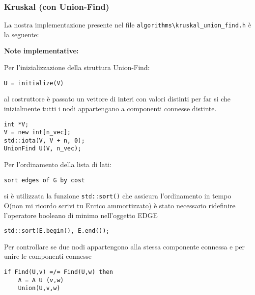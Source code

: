 \documentclass[]{article}
\begin{document}
\subsubsection{Kruskal (con Union-Find)}
\begin{flushleft}
La nostra implementazione presente nel file \verb|algorithms\kruskal_union_find.h| è la seguente:

\lstset{language=c++, style=mystyle}


\textbf{Note implementative:}

\medskip
Per l'inizializzazione della struttura Union-Find:

\begin{lstlisting}
U = initialize(V)
\end{lstlisting}

\smallskip
al costruttore è passato un vettore di interi con valori distinti per far si che inizialmente tutti i nodi appartengano a componenti connesse distinte.

\lstset{language=c++, style=mystyle, firstnumber=4}  	 	
\begin{lstlisting}
int *V;
V = new int[n_vec];
std::iota(V, V + n, 0);
UnionFind U(V, n_vec);
\end{lstlisting}

\medskip
Per l'ordinamento della lista di lati:

\begin{lstlisting}
sort edges of G by cost
\end{lstlisting}

\smallskip
si è utilizzata la funzione \verb|std::sort()| che assicura l'ordinamento in tempo O(non mi ricordo scrivi tu Enrico ammortizzato)%
 è stato necessario ridefinire l'operatore booleano di minimo nell'oggetto EDGE
 
\lstset{language=c++, style=mystyle, firstnumber=2} 	 	
\begin{lstlisting}
std::sort(E.begin(), E.end());
\end{lstlisting}

\medskip
Per controllare se due nodi appartengono alla stessa componente connessa e per unire le componenti connesse
\begin{lstlisting}
if Find(U,v) =/= Find(U,w) then
	A = A U (v,w)
	Union(U,v,w)
\end{lstlisting}


\end{flushleft}
\end{document}
